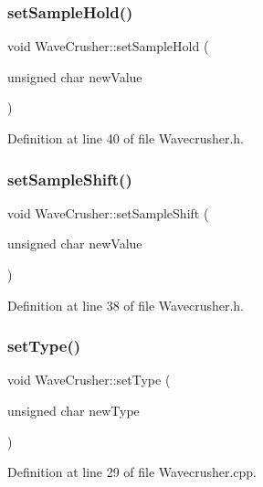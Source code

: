 \subsubsection{\texorpdfstring{set\+Sample\+Hold()}{setSampleHold()}}
{\footnotesize\ttfamily void Wave\+Crusher\+::set\+Sample\+Hold (\begin{DoxyParamCaption}\item[{unsigned char}]{new\+Value }\end{DoxyParamCaption})\hspace{0.3cm}{\ttfamily [inline]}}



Definition at line 40 of file Wavecrusher.\+h.

\mbox{\label{class_wave_crusher_a94b87729fc0b2930b98e8c5fb9ed2631}} 
\subsubsection{\texorpdfstring{set\+Sample\+Shift()}{setSampleShift()}}
{\footnotesize\ttfamily void Wave\+Crusher\+::set\+Sample\+Shift (\begin{DoxyParamCaption}\item[{unsigned char}]{new\+Value }\end{DoxyParamCaption})\hspace{0.3cm}{\ttfamily [inline]}}



Definition at line 38 of file Wavecrusher.\+h.

\mbox{\label{class_wave_crusher_a61ba1c5b0cf0c3bd1f112de317f2deb3}} 
\subsubsection{\texorpdfstring{set\+Type()}{setType()}}
{\footnotesize\ttfamily void Wave\+Crusher\+::set\+Type (\begin{DoxyParamCaption}\item[{unsigned char}]{new\+Type }\end{DoxyParamCaption})}



Definition at line 29 of file Wavecrusher.\+cpp.

